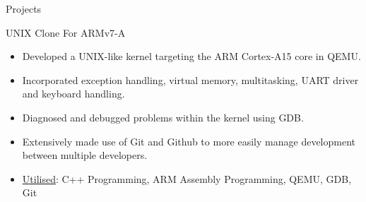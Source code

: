\documentclass[]{mcdowellcv}
\begin{document}
	\begin{cvsection}{Projects}
		\begin{cvsubsection}{UNIX Clone For ARMv7-A}{}{}
			\begin{itemize}
				\item Developed a UNIX-like kernel targeting the ARM Cortex-A15 core in QEMU.
				\item Incorporated exception handling, virtual memory, multitasking, UART driver and keyboard handling.
				\item Diagnosed and debugged problems within the kernel using GDB.
				\item Extensively made use of Git and Github to more easily manage development between multiple developers.
				\item \underline{Utilised}: C++ Programming, ARM Assembly Programming, QEMU, GDB, Git
			\end{itemize}
		\end{cvsubsection}


\end{cvsection}
\end{document}
